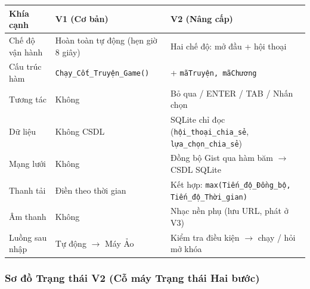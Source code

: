 \documentclass[12pt,a4paper]{article}
\begin{document}
\begin{table}[H]
\centering
\begin{tabularx}{\linewidth}{|l|X|X|}
    \hline
    \textbf{Khía cạnh} & \textbf{V1 (Cơ bản)} & \textbf{V2 (Nâng cấp)} \\
    \hline
    Chế độ vận hành & Hoàn toàn tự động (hẹn giờ 8 giây) & Hai chế độ: mở đầu + hội thoại\\
    \hline
    Cấu trúc hàm 
    & \texttt{Chạy\_Cốt\_Truyện\_Game()} & + \texttt{mãTruyện, mãChương} \\
    \hline
    Tương tác & Không & Bỏ qua / ENTER / TAB / Nhấn chọn \\
    \hline
    Dữ liệu & Không CSDL & SQLite chỉ đọc (\texttt{hội\_thoại\_chia\_sẻ}, \texttt{lựa\_chọn\_chia\_sẻ}) \\
    \hline
    Mạng lưới & Không & Đồng bộ Gist qua hàm băm $\rightarrow$ CSDL SQLite \\
    \hline
    Thanh tải & Điền theo thời gian & Kết hợp: \texttt{max(Tiến\_độ\_Đồng\_bộ, Tiến\_độ\_Thời\_gian)} \\
    \hline
    Âm thanh & Không & Nhạc nền phụ (lưu URL, 
    phát ở V3) \\
    \hline
    Luồng sau nhập & Tự động $\rightarrow$ Máy Ảo & Kiểm tra điều kiện $\rightarrow$ chạy / hỏi mở khóa \\
    \hline
\end{tabularx}
\end{table}

\subsubsection{Sơ đồ Trạng thái V2 (Cỗ máy Trạng thái Hai bước)}
\end{document}
